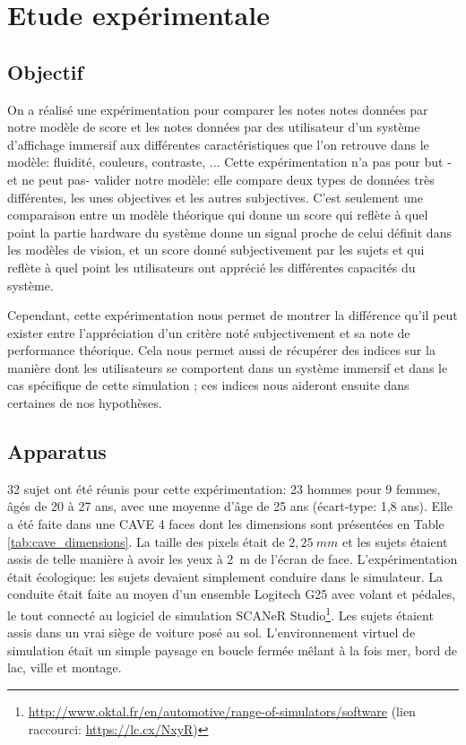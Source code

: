 \chapter{Etude expérimentale}
\label{chap:sdr_etude_experimentale}
	\section{Objectif}
		\par On a réalisé une expérimentation pour comparer les notes notes données par notre modèle de score et les notes données par des utilisateur d'un système d'affichage immersif aux différentes caractéristiques que l'on retrouve dans le modèle: fluidité, couleurs, contraste, ... Cette expérimentation n'a pas pour but -et ne peut pas- valider notre modèle: elle compare deux types de données très différentes, les unes objectives et les autres subjectives. C'est seulement une comparaison entre un modèle théorique qui donne un score qui reflète à quel point la partie hardware du système donne un signal proche de celui définit dans les modèles de vision, et un score donné subjectivement par les sujets et qui reflète à quel point les utilisateurs ont apprécié les différentes capacités du système.
		
		\par Cependant, cette expérimentation nous permet de montrer la différence qu'il peut exister entre l'appréciation d'un critère noté subjectivement et sa note de performance théorique. Cela nous permet aussi de récupérer des indices sur la manière dont les utilisateurs se comportent dans un système immersif et dans le cas spécifique de cette simulation ; ces indices nous aideront ensuite dans certaines de nos hypothèses.
		
	\section{Apparatus}
	\par 32 sujet ont été réunis pour cette expérimentation: 23 hommes pour 9 femmes, âgés de 20 à 27 ans, avec une moyenne d'âge de 25 ans (écart-type: 1,8 ans). Elle a été faite dans une CAVE 4 faces dont les dimensions sont présentées en Table \ref{tab:cave_dimensions}. La taille des pixels était de $2,25~mm$ et les sujets étaient assis de telle manière à avoir les yeux à 2~m de l'écran de face. L'expérimentation était écologique: les sujets devaient simplement conduire dans le simulateur. La conduite était faite au moyen d'un ensemble Logitech G25 avec volant et pédales, le tout connecté au logiciel de simulation SCANeR Studio\footnote{\url{http://www.oktal.fr/en/automotive/range-of-simulators/software} (lien raccourci: \url{https://lc.cx/NxyR})}. Les sujets étaient assis dans un vrai siège de voiture posé au sol. L'environnement virtuel de simulation était un simple paysage en boucle fermée mêlant à la fois mer, bord de lac, ville et montage.
	 
